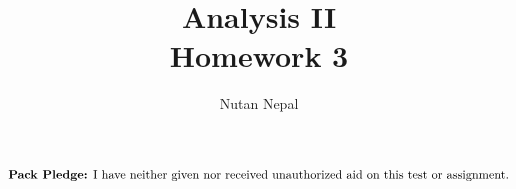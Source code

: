 \documentclass[12pt]{article}
\title{Analysis II \\
\large Homework 3
}
\author{Nutan Nepal}
\newcommand{\packpledge}{
    $\text{{\bf Pack Pledge:} I have neither given nor
    received unauthorized aid on this
    test or assignment.}$}
\begin{document}
\maketitle
\packpledge\\
\makebox[\linewidth]{\rule{200mm}{1pt}}
\vspace{1mm}


\newcommand{\mR}{\mathbb{R}}
\newcommand{\mN}{\mathbb{N}}
\newcommand{\mC}{\mathbb{C}}
\newcommand{\mQ}{\mathbb{Q}}
\newcommand{\mq}{\mathbb{Q}}
\newcommand{\cP}{\mathcal{P}}
\newcommand{\cB}{\mathcal{B}}
\newcommand{\cM}{\mathcal{M}}
\newcommand{\ds}{\displaystyle}
\newcommand{\al}{\alpha}
\newcommand{\li}{l^{\infty}}
\newcommand{\ep}{\varepsilon}
\newcommand{\de}{\delta}
\newcommand{\T}{\mathcal{T}}
\newcommand{\linf}{l^{\infty}}
\newcommand{\cD}{\mathcal{D}}
\newcommand{\cR}{\mathcal{R}}
\newcommand{\cN}{\mathcal{N}}
\newcommand{\lsn}{\limsup_{n \to \infty}}
\newcommand{\lin}{\liminf_{n \to \infty}}
\newcommand{\eq}{\Leftrightarrow}
\newcommand{\dmu}{\ d\mu}
\newcommand{\ix}{\int_X}
\newcommand{\cL}{\mathcal{L}(\mathbb{R})}
\newcommand{\soi}{\sum_{i=1}^{\infty}}
\newcommand{\son}{\sum_{i=1}^{n}}
\end{document}

